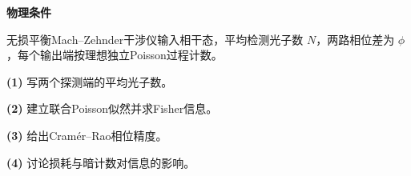 \textbf{物理条件}\par 无损平衡Mach–Zehnder干涉仪输入相干态，平均检测光子数 \(N\)，两路相位差为 \(\phi\)，每个输出端按理想独立Poisson过程计数。
\par\noindent\textbf{(1)} 写两个探测端的平均光子数。
\par\noindent\textbf{(2)} 建立联合Poisson似然并求Fisher信息。
\par\noindent\textbf{(3)} 给出Cramér–Rao相位精度。
\par\noindent\textbf{(4)} 讨论损耗与暗计数对信息的影响。
